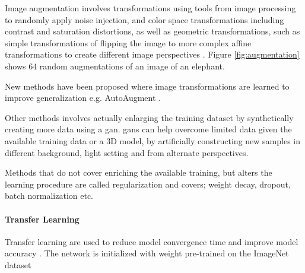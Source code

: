 Image augmentation involves transformations using tools from image processing to randomly apply noise injection, and color space transformations including contrast and saturation distortions, as well as geometric transformations, such as simple transformations of flipping the image to more complex affine transformations to create different image perspectives \cite{shorten_survey_2019}. Figure \ref{fig:augmentation} shows 64 random augmentations of an image of an elephant. 

New methods have been proposed where image transformations are learned to improve generalization e.g. AutoAugment \cite{cubuk_autoaugment:_2018}. 

Other methods involves actually enlarging the training dataset by synthetically creating more data using a \gls{gan}. \gls{gan}s can help overcome limited data given the available training data or a 3D model, by artificially constructing new samples in different background, light setting and from alternate perspectives.

Methods that do not cover enriching the available training, but alters the learning procedure are called regularization and covers; weight decay, dropout, batch normalization etc.

\paragraph{Transfer Learning}

Transfer learning are used  to reduce model convergence time and improve model accuracy \cite{yosinski_how_2014}. The network is initialized with weight pre-trained on the ImageNet dataset
